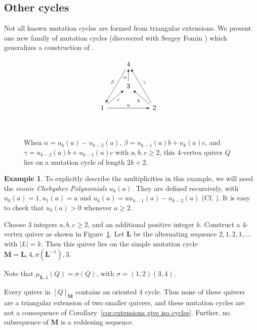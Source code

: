 \documentclass[11pt, letterpaper]{amsart}
\theoremstyle{definition}
\newtheorem{example}[theorem]{Example}
\numberwithin{equation}{section}
\begin{document}
\subsection{Other cycles}

Not all known mutation cycles are formed from triangular extensions.
We present one new family of mutation cycles (discovered with Sergey Fomin \cite{fominPrivComs}) which generalizes a construction of \textcite{MR2805200}.

\begin{figure}[ht]
\centering

\[\begin{tikzcd}[every arrow/.append style = {-{Stealth}}]
    & 4 \\
    & 3 \\
    1 & & 2 \\
    \arrow[from=2-2, to=1-2, "\alpha", pos=0.3]
    \arrow[from=3-1, to=2-2, "c", swap]
    \arrow[from=3-3, to=2-2, "b"]
    \arrow[from=1-2, to=3-1, "\beta", swap]
    \arrow[from=3-1, to=3-3, "a"]
    \arrow[from=3-3, to=1-2, "\gamma", swap]
    \end{tikzcd}\]
\caption{When $\alpha = u_{k}(a) - u_{k-2}(a)$, $\beta = u_{k-1}(a)b + u_{k}(a)c$, and $\gamma = u_{k-2}(a)b + u_{k-1}(a)c$ with $a,b,c \geq 2$, this $4$-vertex quiver $Q$ lies on a mutation cycle of length $2k+2$.}
\label{fig:fordy-marsh}
\end{figure}

\begin{example}
\label{eg:fordy-marsh not extension}
To explicitly describe the multiplicities in this example, we will need the \emph{monic Chebyshev Polynomials} $u_k(a)$. 
They are defined recursively, with $u_0(a)=1, u_1(a) = a$ and $u_k(a) = a u_{k-1}(a) - u_{k-2}(a)$ (Cf. \cite[Section 3]{LMC}). %
It is easy to check that $u_k(a) > 0$ whenever $a \geq 2$.

Choose $3$ integers $a,b,c \geq 2$, and an additional positive integer $k$.
Construct a $4$-vertex quiver as shown in Figure~\ref{fig:fordy-marsh}.
Let $\mathbf L$ be the alternating sequence $2,1,2,1, \ldots$ with $|L|=k$.
Then this quiver lies on the simple mutation cycle $\mathbf M = \mathbf L, 4, \sigma(\mathbf L^{-1}), 3.$

Note that $\mu_{\mathbf L, 4}(Q) = \sigma(Q)$, with $\sigma = (1,2) (3,4)$.

Every quiver in $[Q]_{\mathbf M}$ contains an oriented $4$ cycle. 
Thus none of these quivers are a triangular extension of two smaller quivers, and these mutation cycles are not a consequence of Corollary~\ref{cor:extensions give iso cycles}.
Further, no subsequence of $\mathbf M$ is a reddening sequence. 
\end{example}
\end{document}
